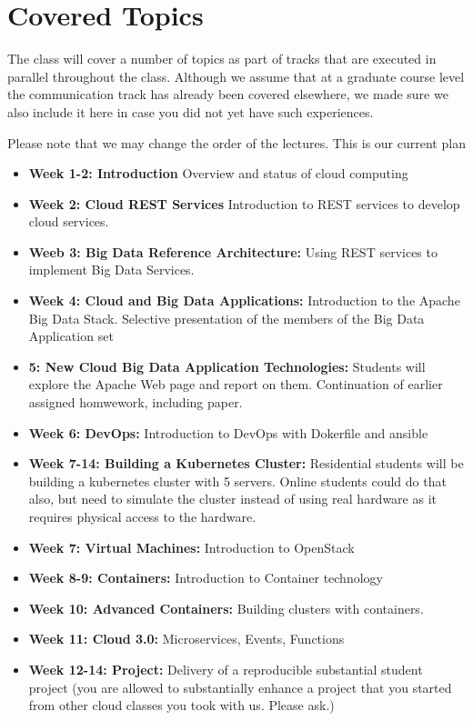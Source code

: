 \section{Covered Topics}

The class will cover a number of topics as part of tracks that are
executed in parallel throughout the class. Although we assume that at
a graduate course level the communication track has already been
covered elsewhere, we made sure we also include it here in case you did
not yet have such experiences.

Please note that we may change the order of the lectures. This is our
current plan

\begin{itemize}

\item {\bf Week 1-2: Introduction} Overview and status of cloud
  computing
\item {\bf Week 2: Cloud REST Services} Introduction to REST services
  to develop cloud services.
\item {\bf Weeb 3: Big Data Reference Architecture:} Using REST
  services to implement Big Data Services.
\item {\bf Week 4: Cloud and Big Data Applications:} Introduction to
  the Apache Big Data Stack. Selective presentation of the members of
  the Big Data Application set
\item {\bf 5: New Cloud Big Data Application Technologies:} Students will
  explore the Apache Web page and report on them. Continuation of
  earlier assigned homwework, including paper.
\item {\bf Week 6: DevOps:} Introduction to DevOps with Dokerfile and
  ansible
\item {\bf Week 7-14: Building a Kubernetes Cluster:} Residential
  students will be building a kubernetes cluster with 5
  servers. Online students could do that also, but need to simulate
  the cluster instead of using real hardware as it requires physical
  access to the hardware.

\item {\bf Week 7: Virtual Machines:} Introduction to OpenStack
\item {\bf Week 8-9: Containers:} Introduction to Container technology
\item {\bf Week 10: Advanced Containers:} Building clusters with containers.
\item {\bf Week 11: Cloud 3.0:} Microservices, Events, Functions  
\item {\bf Week 12-14: Project:} Delivery of a reproducible substantial
  student project (you are allowed to substantially enhance a project
  that you started from other cloud classes you took with us. Please ask.)
\end{itemize}

